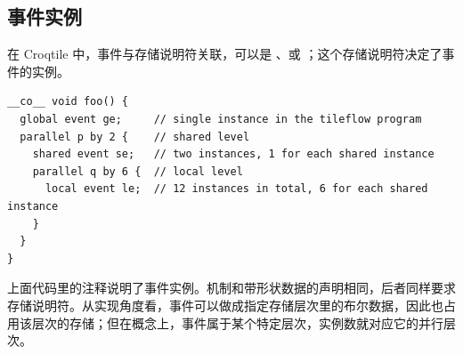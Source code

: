 \subsection*{事件实例}

在 Croqtile 中，事件与存储说明符关联，可以是 \co@global@、\co@shared@ 或 \co@local@；这个存储说明符决定了事件的实例。

\begin{lstlisting}[language=croqtile,caption={事件实例}]
__co__ void foo() {
  global event ge;     // single instance in the tileflow program
  parallel p by 2 {    // shared level
    shared event se;   // two instances, 1 for each shared instance
    parallel q by 6 {  // local level
      local event le;  // 12 instances in total, 6 for each shared instance
    }
  }
}
\end{lstlisting}

上面代码里的注释说明了事件实例。机制和带形状数据的声明相同，后者同样要求存储说明符。从实现角度看，事件可以做成指定存储层次里的布尔数据，因此也占用该层次的存储；但在概念上，事件属于某个特定层次，实例数就对应它的并行层次。
